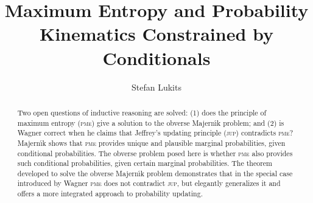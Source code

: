 \documentclass[11pt]{article}
\begin{document}

\title{Maximum Entropy and Probability Kinematics Constrained by Conditionals}
\author{Stefan Lukits}
\date{}
\maketitle
{}

\begin{abstract}
Two open questions of inductive reasoning are solved: (1) does the
principle of maximum entropy (\textsc{pme}) give a solution to the
obverse Majern{\'\i}k problem; and (2) is Wagner correct when he
claims that Jeffrey's updating principle (\textsc{jup}) contradicts
\textsc{pme}?  Majern{\'\i}k shows that \textsc{pme} provides unique
and plausible marginal probabilities, given conditional probabilities.
The obverse problem posed here is whether \textsc{pme} also provides
such conditional probabilities, given certain marginal probabilities.
The theorem developed to solve the obverse Majern{\'\i}k problem
demonstrates that in the special case introduced by Wagner
\textsc{pme} does not contradict \textsc{jup}, but elegantly
generalizes it and offers a more integrated approach to probability
updating.
\end{abstract}


\end{document}
